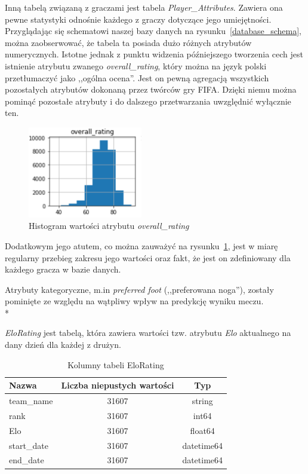    \noindent Inną tabelą związaną z graczami jest tabela \emph{Player\_Attributes}. Zawiera ona pewne statystyki odnośnie każdego z graczy dotyczące jego umiejętności. Przyglądając się schematowi naszej bazy danych na rysunku~\ref{database_schema}, można zaobserwować, że tabela ta posiada dużo różnych atrybutów numerycznych. Istotne jednak z punktu widzenia późniejszego tworzenia cech jest istnienie atrybutu zwanego \emph{overall\_rating}, który można na język polski przetłumaczyć jako ,,ogólna ocena''. Jest on pewną agregacją wszystkich pozostałych atrybutów dokonaną przez twórców gry FIFA. Dzięki niemu można pominąć pozostałe atrybuty i do dalszego przetwarzania uwzględnić wyłącznie ten.
    
    \begin{figure}[H] 
        \centering\includegraphics[width=5cm]{figures/overall_rating.png}
        \caption{Histogram wartości atrybutu \emph{overall\_rating}}
        \label{fig:overall_rating}
    \end{figure}
    
    \noindent Dodatkowym jego atutem, co można zauważyć na rysunku~\ref{fig:overall_rating}, jest w miarę regularny przebieg  zakresu jego wartości oraz fakt, że jest on zdefiniowany dla każdego gracza w bazie danych.
    
    Atrybuty kategoryczne, m.in \emph{preferred foot} (,,preferowana noga''), zostały pominięte ze względu na wątpliwy wpływ na predykcję wyniku meczu. \\*
    
    \noindent \emph{EloRating} jest tabelą, która zawiera wartości tzw. atrybutu \emph{Elo} aktualnego na dany dzień dla każdej z drużyn.
    
    \begin{table}[H]
    \caption{Kolumny tabeli EloRating}\label{tab:elo}
    \centering\footnotesize%
    \begin{tabular}{l c c}
    \toprule
        Nazwa & Liczba niepustych wartości & Typ \\
    \midrule
        team\_name & 31607 & string \\
        rank & 31607 & int64 \\
        Elo & 31607 & float64 \\
        start\_date & 31607 & datetime64 \\
        end\_date & 31607 & datetime64 \\
    \bottomrule
    \end{tabular}
    \end{table}
    
